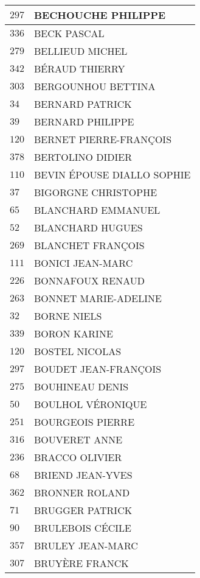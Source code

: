 \begin{xltabular}{\linewidth}{|l|X|}
    $297$ & BECHOUCHE PHILIPPE \\
    \hline
    $336$ & BECK PASCAL \\
    \hline
    $279$ & BELLIEUD MICHEL \\
    \hline
    $342$ & BÉRAUD THIERRY \\
    \hline
    $303$ & BERGOUNHOU BETTINA \\
    \hline
    $34$ & BERNARD PATRICK \\
    \hline
    $39$ & BERNARD PHILIPPE \\
    \hline
    $120$ & BERNET PIERRE-FRANÇOIS \\
    \hline
    $378$ & BERTOLINO DIDIER \\
    \hline
    $110$ & BEVIN ÉPOUSE DIALLO SOPHIE \\
    \hline
    $37$ & BIGORGNE CHRISTOPHE \\
    \hline
    $65$ & BLANCHARD EMMANUEL \\
    \hline
    $52$ & BLANCHARD HUGUES \\
    \hline
    $269$ & BLANCHET FRANÇOIS \\
    \hline
    $111$ & BONICI JEAN-MARC \\
    \hline
    $226$ & BONNAFOUX RENAUD \\
    \hline
    $263$ & BONNET MARIE-ADELINE \\
    \hline
    $32$ & BORNE NIELS \\
    \hline
    $339$ & BORON KARINE \\
    \hline
    $120$ & BOSTEL NICOLAS \\
    \hline
    $297$ & BOUDET JEAN-FRANÇOIS \\
    \hline
    $275$ & BOUHINEAU DENIS \\
    \hline
    $50$ & BOULHOL VÉRONIQUE \\
    \hline
    $251$ & BOURGEOIS PIERRE \\
    \hline
    $316$ & BOUVERET ANNE \\
    \hline
    $236$ & BRACCO OLIVIER \\
    \hline
    $68$ & BRIEND JEAN-YVES \\
    \hline
    $362$ & BRONNER ROLAND \\
    \hline
    $71$ & BRUGGER PATRICK \\
    \hline
    $90$ & BRULEBOIS CÉCILE \\
    \hline
    $357$ & BRULEY JEAN-MARC \\
    \hline
    $307$ & BRUYÈRE FRANCK \\

\end{xltabular}
